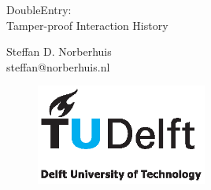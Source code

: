 \begin{titlepage}

\null\vfill

\begin{center}
\LARGE{DoubleEntry:\\ Tamper-proof Interaction History}
\end{center}

\vspace{1.5cm}

\begin{center}
Steffan D. Norberhuis\\
steffan@norberhuis.nl
\end{center}

\vfill

\begin{figure}[!b]
\centering
\includegraphics[width={0.5\textwidth}]{pics/TUD_logo_color.eps}
\end{figure}

\vspace{2.0cm}

\end{titlepage}

